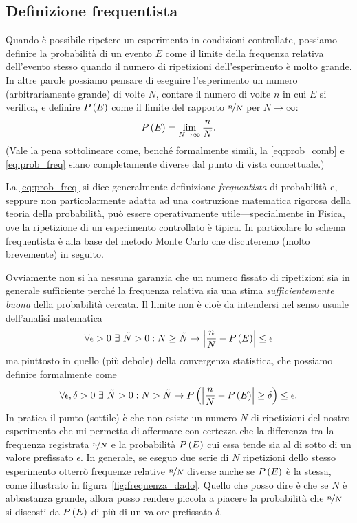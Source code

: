 \subsection{Definizione frequentista}
\label{sec:prop_definizione_freq}

Quando è possibile ripetere un esperimento in condizioni controllate,
possiamo definire la probabilità di un evento $E$ come il limite
della frequenza relativa dell'evento stesso quando il numero di ripetizioni
dell'esperimento è molto grande. In altre parole possiamo pensare di
eseguire l'esperimento un numero (arbitrariamente grande) di volte $N$, contare
il numero di volte $n$ in cui $E$ si verifica, e definire $\displaystyle P\left(E\right)$ come
il limite del rapporto $\nicefrac{n}{N}$ per $N\rightarrow \infty$:
\begin{align}\label{eq:prob_freq}
  \displaystyle P\left(E\right) = \lim_{N \rightarrow \infty}\frac{n}{N}.
\end{align}
(Vale la pena sottolineare come, benché formalmente simili, la
\eqref{eq:prob_comb} e \eqref{eq:prob_freq} siano completamente diverse dal
punto di vista concettuale.)

La \eqref{eq:prob_freq} si dice generalmente definizione \emph{frequentista} di
probabilità e, seppure non particolarmente adatta ad una costruzione
matematica rigorosa della teoria della probabilità, può essere
operativamente utile---specialmente in Fisica, ove la ripetizione di un
esperimento controllato è tipica. In particolare lo schema frequentista è
alla base del metodo Monte Carlo che discuteremo (molto brevemente) in seguito.

Ovviamente non si ha nessuna garanzia che un numero fissato di ripetizioni sia
in generale sufficiente perché la frequenza relativa sia una stima
\emph{sufficientemente buona} della probabilità cercata. Il limite non è
cioè da intendersi nel senso usuale dell'analisi matematica
\begin{align*}
  \forall \epsilon > 0 \ \exists \ \tilde{N} > 0 : N \geq \tilde{N} \rightarrow
  \left| \frac{n}{N} - \displaystyle P\left(E\right) \right| \leq \epsilon
\end{align*}
ma piuttosto in quello (più debole) della convergenza statistica, che possiamo
definire formalmente come
\begin{align*}
  \forall \epsilon, \delta > 0 \ \exists \ \tilde{N} > 0 :
  N > \tilde{N} \rightarrow
  \displaystyle P\left(\left| \frac{n}{N} - \displaystyle P\left(E\right) \right| \geq \delta \right) \leq \epsilon.
\end{align*}
In pratica il punto (sottile) è che non esiste un numero $N$ di ripetizioni
del nostro esperimento che mi permetta di affermare con certezza che la
differenza tra la frequenza registrata $\nicefrac{n}{N}$ e la probabilità
$\displaystyle P\left(E\right)$ cui essa tende sia al di sotto di un valore prefissato $\epsilon$.
In generale, se eseguo due serie di $N$ ripetizioni dello stesso esperimento
otterrò frequenze relative $\nicefrac{n}{N}$ diverse anche se $\displaystyle P\left(E\right)$ è
la stessa, come illustrato in figura~\ref{fig:frequenza_dado}. Quello che posso
dire è che se $N$ è abbastanza grande, allora posso rendere piccola a
piacere la probabilità che $\nicefrac{n}{N}$ si discosti da $\displaystyle P\left(E\right)$ di
più di un valore prefissato $\delta$.

